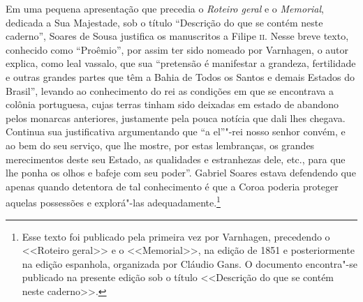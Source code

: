 \documentclass[12pt]{extarticle}
\begin{document}
Em uma pequena apresentação que precedia o \textit{Roteiro geral} e o
\textit{Memorial}, dedicada a Sua Majestade, sob o título ``Descrição do
que se contém neste caderno'', Soares de Sousa justifica os manuscritos a
Filipe 	\textsc{ii}. Nesse breve texto, conhecido como ``Proêmio'', por assim ter
sido nomeado por Varnhagen, o autor explica, como leal vassalo, que sua
``pretensão é manifestar a grandeza, fertilidade e outras grandes partes
que têm a Bahia de Todos os Santos e demais Estados do Brasil'', levando
ao conhecimento do rei as condições em que se encontrava a colônia
portuguesa, cujas terras tinham sido deixadas em estado de abandono
pelos monarcas anteriores, justamente pela pouca notícia que dali lhes
chegava. Continua sua justificativa argumentando que ``a el''"-rei nosso
senhor convém, e ao bem do seu serviço, que lhe mostre, por estas
lembranças, os grandes merecimentos deste seu Estado, as qualidades e
estranhezas dele, etc., para que lhe ponha os olhos e bafeje com seu
poder''. Gabriel Soares estava defendendo que apenas quando detentora de
tal conhecimento é que a Coroa poderia proteger aquelas possessões e
explorá"-las adequadamente.\footnote{Esse texto foi publicado pela
primeira vez por Varnhagen, precedendo o <<Roteiro geral>> e o
<<Memorial>>, na edição de 1851 e posteriormente na edição espanhola,
organizada por Cláudio Gans. O documento encontra"-se publicado na presente edição
sob o título <<Descrição do que se contém neste caderno>>.}

\end{document}
